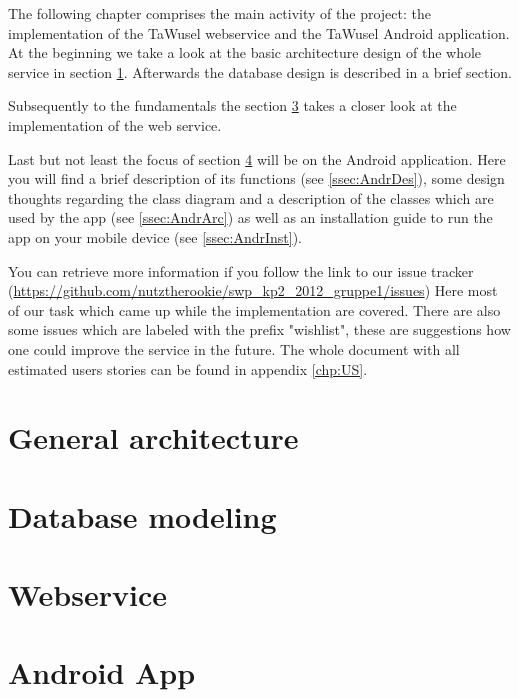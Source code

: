 
The following chapter comprises the main activity of the project: the implementation of the TaWusel webservice and the TaWusel
Android application. At the beginning we take a look at the basic architecture design of the whole service in section
\ref{sec:GArc}. Afterwards the database design is described in a brief section.

\emptyRow
Subsequently to the fundamentals the section \ref{sec:Webs} takes a closer look at the implementation of the web service.

\emptyRow
Last but not least the focus of section \ref{sec:Andr} will be on the Android application. Here you will find a brief description
of its functions (see \ref{ssec:AndrDes}), some design thoughts regarding the class diagram and a description of the classes which
are used by the app (see \ref{ssec:AndrArc}) as well as an installation guide to run the app on your mobile device (see
\ref{ssec:AndrInst}). 

\emptyRow
You can retrieve more information if you follow the link to our issue tracker
(\url{https://github.com/nutztherookie/swp_kp2_2012_gruppe1/issues}) Here most of our task which came up while the implementation
are covered. There are also some issues which are labeled with the prefix "wishlist", these are suggestions how one could improve
the service in the future. The whole document with all estimated users stories can be found in appendix \ref{chp:US}.

\clearpage

\section{General architecture}\label{sec:GArc}


\clearpage
\section{Database modeling}


\clearpage
\section{Webservice}\label{sec:Webs}


\clearpage
\section{Android App}\label{sec:Andr}


